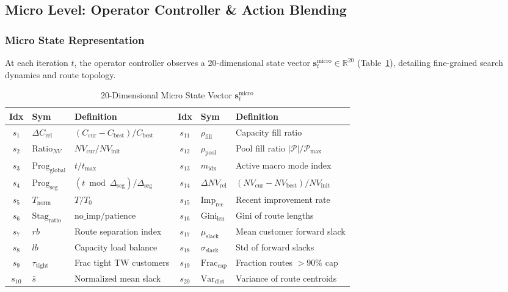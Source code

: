 \documentclass{ieeeaccess}
\begin{document}
\subsection{Micro Level: Operator Controller \& Action Blending}
\label{sec:micro_controller}

\subsubsection{Micro State Representation}
At each iteration $t$, the operator controller observes a 20-dimensional state vector $\mathbf{s}_t^{\text{micro}} \in \mathbb{R}^{20}$ (Table~\ref{tab:micro_state}), detailing fine-grained search dynamics and route topology.

\begin{table}[!b]
\caption{20-Dimensional Micro State Vector $\mathbf{s}_t^{\text{micro}}$}
\label{tab:micro_state}
\centering
\scriptsize
\setlength{\tabcolsep}{1.2pt}
\begin{tabularx}{\columnwidth}{cl>{\raggedright\arraybackslash}X cl>{\raggedright\arraybackslash}X}
\toprule
\textbf{Idx} & \textbf{Sym} & \textbf{Definition} & \textbf{Idx} & \textbf{Sym} & \textbf{Definition} \\
\midrule
$s_1$ & $\Delta C_{\text{rel}}$ & $(C_{\text{cur}}\!-\!C_{\text{best}})/C_{\text{best}}$ & $s_{11}$ & $\rho_{\text{fill}}$ & Capacity fill ratio \\
$s_2$ & $\text{Ratio}_{NV}$ & $NV_{\text{cur}}/NV_{\text{init}}$ & $s_{12}$ & $\rho_{\text{pool}}$ & Pool fill ratio $|\mathcal{P}|/\mathcal{P}_{\max}$ \\
$s_3$ & $\text{Prog}_{\text{global}}$ & $t / t_{\max}$ & $s_{13}$ & $m_{\text{idx}}$ & Active macro mode index \\
$s_4$ & $\text{Prog}_{\text{seg}}$ & $(t \bmod \Delta_{\text{seg}})/\Delta_{\text{seg}}$ & $s_{14}$ & $\Delta NV_{\text{rel}}$ & $(NV_{\text{cur}}\!-\!NV_{\text{best}})/NV_{\text{init}}$ \\
$s_5$ & $T_{\text{norm}}$ & $T / T_0$ & $s_{15}$ & $\text{Imp}_{\text{rec}}$ & Recent improvement rate \\
$s_6$ & $\text{Stag}_{\text{ratio}}$ & $\text{no\_imp} / \text{patience}$ & $s_{16}$ & $\text{Gini}_{\text{len}}$ & Gini of route lengths \\
$s_7$ & $rb$ & Route separation index & $s_{17}$ & $\mu_{\text{slack}}$ & Mean customer forward slack \\
$s_8$ & $lb$ & Capacity load balance & $s_{18}$ & $\sigma_{\text{slack}}$ & Std of forward slacks \\
$s_9$ & $\tau_{\text{tight}}$ & Frac tight TW customers & $s_{19}$ & $\text{Frac}_{\text{cap}}$ & Fraction routes $>90\%$ cap \\
$s_{10}$ & $\bar{s}$ & Normalized mean slack & $s_{20}$ & $\text{Var}_{\text{dist}}$ & Variance of route centroids \\
\bottomrule
\end{tabularx}
\end{table}
\end{document}
